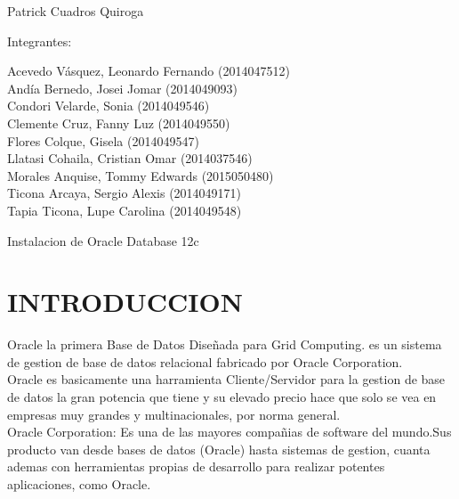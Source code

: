 \documentclass[12pt,letterpaper]{article}
\begin{document}
\begin{titlepage}
\begin{center}
\vspace*{0.1in}
\begin{large}
 Patrick Cuadros Quiroga\\
\end{large}

\vspace*{0.2in}
\vspace*{0.1in}
\begin{large}
Integrantes: \\
\begin{flushleft}
Acevedo Vásquez, Leonardo Fernando 	(2014047512) \\
Andía Bernedo, Josei Jomar 			(2014049093) \\
Condori Velarde, Sonia          	(2014049546) \\
Clemente Cruz, Fanny Luz    		(2014049550) \\
Flores Colque, Gisela           	(2014049547) \\
Llatasi Cohaila, Cristian Omar		(2014037546) \\
Morales Anquise, Tommy Edwards 		(2015050480) \\
Ticona Arcaya, Sergio Alexis		(2014049171) \\
Tapia Ticona, Lupe Carolina			(2014049548) \\
\end{flushleft}
\end{large}
\end{center}

\end{titlepage}




 \tableofcontents
 \newpage
Instalacion de Oracle Database 12c
 
\section{INTRODUCCION} 
Oracle la primera Base de Datos Diseñada para Grid Computing. es un sistema de gestion de  base de datos relacional fabricado por Oracle Corporation.\\
Oracle es basicamente una harramienta Cliente/Servidor para la gestion de base de datos la gran potencia que tiene y su elevado precio hace que solo se vea en empresas muy grandes y multinacionales, por norma general. \\
Oracle Corporation: Es una de las mayores compañias de software del mundo.Sus producto van desde bases de datos (Oracle) hasta sistemas de gestion, cuanta ademas con herramientas propias de desarrollo para realizar potentes aplicaciones, como Oracle. \\
\end{document}
